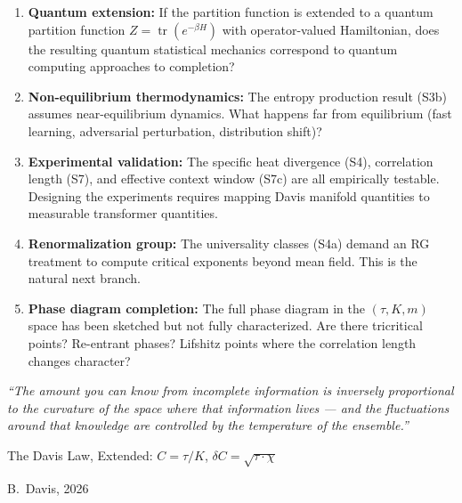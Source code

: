 \documentclass[11pt,letterpaper]{article}
\newcommand{\tr}{\operatorname{tr}}
\begin{document}
\begin{enumerate}[label=\arabic*.]
    \item \textbf{Quantum extension:} If the partition function is 
    extended to a quantum partition function $Z = \tr(e^{-\beta H})$ 
    with operator-valued Hamiltonian, does the resulting quantum 
    statistical mechanics correspond to quantum computing approaches 
    to completion?
    
    \item \textbf{Non-equilibrium thermodynamics:} The entropy 
    production result (S3b) assumes near-equilibrium dynamics. What 
    happens far from equilibrium (fast learning, adversarial 
    perturbation, distribution shift)?
    
    \item \textbf{Experimental validation:} The specific heat 
    divergence (S4), correlation length (S7), and effective context 
    window (S7c) are all empirically testable. Designing the 
    experiments requires mapping Davis manifold quantities to 
    measurable transformer quantities.
    
    \item \textbf{Renormalization group:} The universality classes 
    (S4a) demand an RG treatment to compute critical exponents 
    beyond mean field. This is the natural next branch.
    
    \item \textbf{Phase diagram completion:} The full phase diagram 
    in the $(\tau, K, m)$ space has been sketched but not fully 
    characterized. Are there tricritical points? Re-entrant phases? 
    Lifshitz points where the correlation length changes character?
\end{enumerate}

\vfill

\begin{center}
\large
\textit{``The amount you can know from incomplete information is 
inversely proportional to the curvature of the space where that 
information lives --- and the fluctuations around that knowledge 
are controlled by the temperature of the ensemble.''}

\bigskip

The Davis Law, Extended: $C = \tau / K$, $\delta C = \sqrt{\tau \cdot \chi}$

\bigskip

B.\ Davis, 2026
\end{center}
\end{document}
